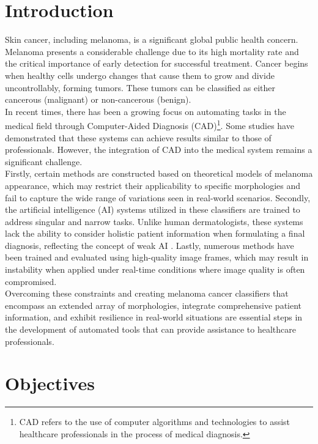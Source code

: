 \section*{Introduction}

Skin cancer, including melanoma, is a significant global public health concern.
Melanoma presents a considerable challenge due to its high mortality rate and
the critical importance of early detection for successful treatment. Cancer
begins when healthy cells undergo changes that cause them to grow and divide
uncontrollably, forming tumors. These tumors can be classified as either
cancerous (malignant) or non-cancerous (benign).\\

In recent times, there has been a growing focus on automating tasks in the
medical field through Computer-Aided Diagnosis (CAD)\footnote{CAD refers to the
use of computer algorithms and technologies to assist healthcare professionals
in the process of medical diagnosis.}. Some studies have demonstrated that
these systems can achieve results similar to those of professionals. However,
the integration of CAD into the medical system remains a significant challenge. \\

Firstly, certain methods are constructed based on theoretical models of
melanoma appearance, which may restrict their applicability to specific
morphologies and fail to capture the wide range of variations seen in
real-world scenarios. Secondly, the artificial intelligence (AI) systems
utilized in these classifiers are trained to address singular and narrow tasks.
Unlike human dermatologists, these systems lack the ability to consider
holistic patient information when formulating a final diagnosis, reflecting the
concept of weak AI \cite{WeakAI}. Lastly, numerous methods have been trained
and evaluated using high-quality image frames, which may result in instability
when applied under real-time conditions where image quality is often
compromised. \\

Overcoming these constraints and creating melanoma cancer classifiers that
encompass an extended array of morphologies, integrate comprehensive patient
information, and exhibit resilience in real-world situations are essential
steps in the development of automated tools that can provide assistance to
healthcare professionals.

\newpage

\section*{Objectives}

